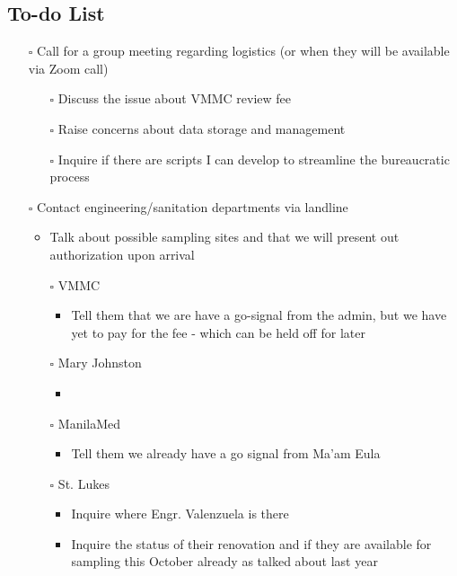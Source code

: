 \documentclass[11pt]{article}
\newcommand{\pending}{$\square$}  %
\begin{document}
\subsection{To-do List}
\begin{itemize}
	\item [\pending] Call for a group meeting regarding logistics (or when they will be available via Zoom call)
	
	\begin{itemize}
		\item [\pending] Discuss the issue about VMMC review fee
		\item [\pending] Raise concerns about data storage and management
		\item [\pending] Inquire if there are scripts I can develop to streamline the bureaucratic process
	
	\end{itemize}
	\item [\pending] Contact engineering/sanitation departments via landline
	\begin{itemize}
		\item Talk about possible sampling sites and that we will present out authorization upon arrival
	\end{itemize}
	\begin{itemize}
		\item [\pending] VMMC 
			\begin{itemize}
				\item Tell them that we are have a go-signal from the admin, but we have yet to pay for the fee - which can be held off for later
			\end{itemize}
		\item [\pending] Mary Johnston
			\begin{itemize}
				\item 
			\end{itemize}
		\item [\pending] ManilaMed 
				\begin{itemize}
				\item Tell them we already have a go signal from Ma'am Eula
			\end{itemize}
		\item [\pending] St. Lukes
			\begin{itemize}
				\item Inquire where Engr. Valenzuela is there
				\item Inquire the status of their renovation and if they are available for sampling this October already as talked about last year
			\end{itemize}
	\end{itemize}
		
\end{itemize}
\end{document}
